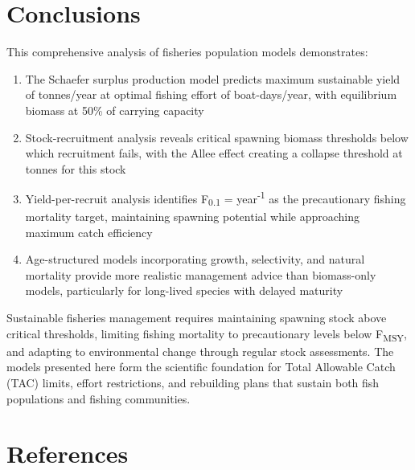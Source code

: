 \documentclass[a4paper, 11pt]{article}
\begin{document}
\section{Conclusions}

This comprehensive analysis of fisheries population models demonstrates:

\begin{enumerate}
\item The Schaefer surplus production model predicts maximum sustainable yield of
 tonnes/year at optimal fishing effort of 
boat-days/year, with equilibrium biomass at 50\% of carrying capacity

\item Stock-recruitment analysis reveals critical spawning biomass thresholds below which
recruitment fails, with the Allee effect creating a collapse threshold at
 tonnes for this stock

\item Yield-per-recruit analysis identifies F\textsubscript{0.1} = 
year\textsuperscript{-1} as the precautionary fishing mortality target, maintaining
spawning potential while approaching maximum catch efficiency

\item Age-structured models incorporating growth, selectivity, and natural mortality
provide more realistic management advice than biomass-only models, particularly for
long-lived species with delayed maturity
\end{enumerate}

Sustainable fisheries management requires maintaining spawning stock above critical
thresholds, limiting fishing mortality to precautionary levels below F\textsubscript{MSY},
and adapting to environmental change through regular stock assessments. The models
presented here form the scientific foundation for Total Allowable Catch (TAC) limits,
effort restrictions, and rebuilding plans that sustain both fish populations and fishing
communities.

\section*{References}
\end{document}
